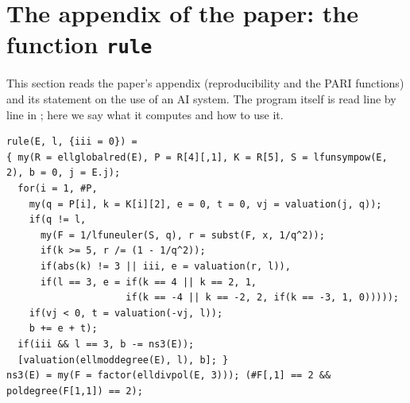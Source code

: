 \begin{sloppypar}
\section[Paper appendix: \texttt{rule}]{The appendix of the paper: the function \texttt{rule}}\label{sec:paper:appendix}

This section reads the paper's appendix (reproducibility and the PARI functions) and its statement on the use of an AI system. The program itself is read line by line in
; here we say what it computes and how to use it.

\begin{lstlisting}[language=GP]
rule(E, l, {iii = 0}) =
{ my(R = ellglobalred(E), P = R[4][,1], K = R[5], S = lfunsympow(E, 2), b = 0, j = E.j);
  for(i = 1, #P,
    my(q = P[i], k = K[i][2], e = 0, t = 0, vj = valuation(j, q));
    if(q != l,
      my(F = 1/lfuneuler(S, q), r = subst(F, x, 1/q^2));
      if(k >= 5, r /= (1 - 1/q^2));
      if(abs(k) != 3 || iii, e = valuation(r, l)),
      if(l == 3, e = if(k == 4 || k == 2, 1,
                     if(k == -4 || k == -2, 2, if(k == -3, 1, 0)))));
    if(vj < 0, t = valuation(-vj, l));
    b += e + t);
  if(iii && l == 3, b -= ns3(E));
  [valuation(ellmoddegree(E), l), b]; }
ns3(E) = my(F = factor(elldivpol(E, 3))); (#F[,1] == 2 && poldegree(F[1,1]) == 2);
\end{lstlisting}


\end{sloppypar}
